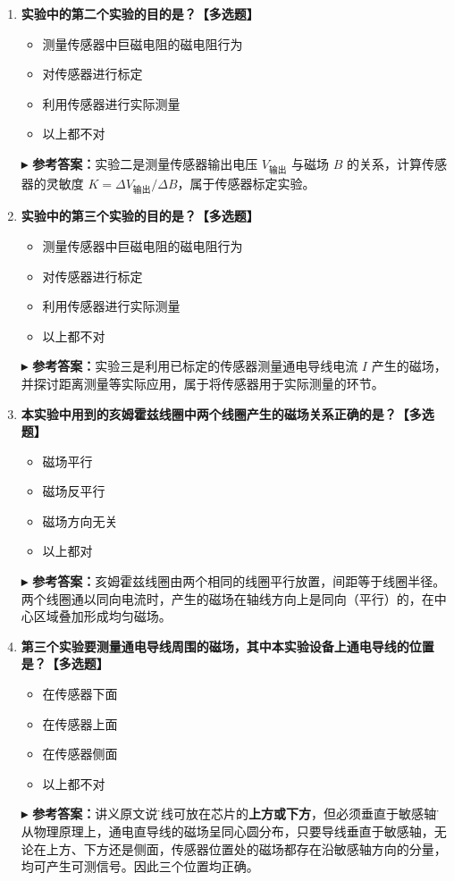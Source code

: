 \documentclass[12pt,a4paper]{article}
\newcommand{\answer}[1]{\vspace{2pt}\noindent\textbf{\color{teal!80!black}▸ 参考答案：}#1\vspace{4pt}}
\begin{document}
\begin{enumerate}[label=\arabic*.]
    \item \textbf{实验中的第二个实验的目的是？【多选题】}
    \begin{itemize}
        \item 测量传感器中巨磁电阻的磁电阻行为
        \item[\checkmark] 对传感器进行标定
        \item 利用传感器进行实际测量
        \item 以上都不对
    \end{itemize}
    \answer{实验二是测量传感器输出电压 $V_{\text{输出}}$ 与磁场 $B$ 的关系，计算传感器的灵敏度 $K = \Delta V_{\text{输出}} / \Delta B$，属于传感器标定实验。}

    \item \textbf{实验中的第三个实验的目的是？【多选题】}
    \begin{itemize}
        \item 测量传感器中巨磁电阻的磁电阻行为
        \item 对传感器进行标定
        \item[\checkmark] 利用传感器进行实际测量
        \item 以上都不对
    \end{itemize}
    \answer{实验三是利用已标定的传感器测量通电导线电流 $I$ 产生的磁场，并探讨距离测量等实际应用，属于将传感器用于实际测量的环节。}

    \item \textbf{本实验中用到的亥姆霍兹线圈中两个线圈产生的磁场关系正确的是？【多选题】}
    \begin{itemize}
        \item[\checkmark] 磁场平行
        \item 磁场反平行
        \item 磁场方向无关
        \item 以上都对
    \end{itemize}
    \answer{亥姆霍兹线圈由两个相同的线圈平行放置，间距等于线圈半径。两个线圈通以同向电流时，产生的磁场在轴线方向上是同向（平行）的，在中心区域叠加形成均匀磁场。}

    \item \textbf{第三个实验要测量通电导线周围的磁场，其中本实验设备上通电导线的位置是？【多选题】}
    \begin{itemize}
        \item[\checkmark] 在传感器下面
        \item[\checkmark] 在传感器上面
        \item[\checkmark] 在传感器侧面
        \item 以上都不对
    \end{itemize}
    \answer{讲义原文说\"导线可放在芯片的\textbf{上方或下方}，但必须垂直于敏感轴\"。从物理原理上，通电直导线的磁场呈同心圆分布，只要导线垂直于敏感轴，无论在上方、下方还是侧面，传感器位置处的磁场都存在沿敏感轴方向的分量，均可产生可测信号。因此三个位置均正确。}


\end{enumerate}
\end{document}
